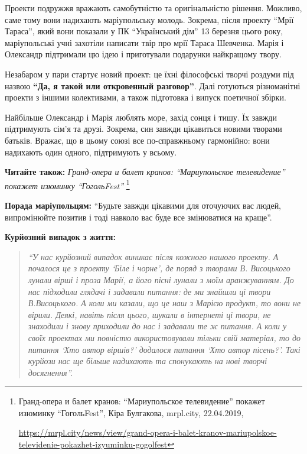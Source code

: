 Проекти подружжя вражають самобутністю та оригінальністю рішення. Можливо, саме
тому вони надихають маріупольську молодь. Зокрема, після проекту \enquote{Мрії Тараса},
який вони показали у ПК \enquote{Український дім} 13 березня цього року, маріупольські
учні захотіли написати твір про мрії Тараса Шевченка. Марія і Олександр
підтримали цю ідею і приготували подарунки найкращому твору.

Незабаром у пари стартує новий проект: це їхні філософські творчі роздуми під
назвою \textbf{\enquote{Да, я такой или откровенный разговор}}.  Далі готуються різноманітні
проекти з іншими колективами, а також підготовка і випуск поетичної збірки.

Найбільше Олександр і Марія люблять море, захід сонця і тишу. Їх завжди
підтримують сім'я та друзі. Зокрема, син завжди цікавиться новими творами
батьків. Вражає, що в цьому союзі все по-справжньому гармонійно: вони надихають
один одного, підтримують у всьому.

\textbf{Читайте також:} \emph{Гранд-опера и балет кранов: \enquote{Мариупольское телевидение} покажет изюминку \enquote{ГогольFest}}%
\footnote{Гранд-опера и балет кранов: \enquote{Мариупольское телевидение} покажет изюминку \enquote{ГогольFest}, Кіра Булгакова, mrpl.city, 22.04.2019, %
\par\url{https://mrpl.city/news/view/grand-opera-i-balet-kranov-mariupolskoe-televidenie-pokazhet-izyuminku-gogolfest}}

\textbf{Порада маріупольцям:} \enquote{Будьте завжди цікавими для оточуючих вас людей, випромінюйте позитив і тоді навколо вас буде все змінюватися на краще}.

\textbf{Курйозний випадок з життя:} 

\begin{quote}
\em\enquote{У нас курйозний випадок виникає після кожного
нашого проекту. А почалося це з проекту \enquote{Біле і чорне}, де поряд з творами
В. Висоцького лунали вірші і проза Марії, а його пісні лунали з моїм
аранжуванням. До нас підходили глядачі і задавали питання:  де ми знайшли ці
твори В.Висоцького. А коли ми казали, що це наш з Марією продукт, то вони не
вірили. Деякі, навіть після цього, шукали в інтернеті ці твори, не знаходили і
знову приходили до нас і задавали те ж питання. А коли у своїх проектах ми
повністю використовували тільки свій матеріал, то до питання \enquote{Хто автор
віршів?} додалося питання \enquote{Хто автор пісень?}. Такі курйози нас ще більше
надихають та спонукають на нові творчі досягнення}.
\end{quote}

